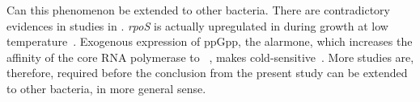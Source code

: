 Can this phenomenon be extended to other bacteria. There are
contradictory evidences in studies in . \emph{rpoS} is
actually upregulated in  during growth at low
temperature~\citep{Sledjeski1996}. Exogenous expression of ppGpp,
the alarmone, which increases the affinity of the core RNA
polymerase to \sigs{}~\citep{Jishage2002}, makes 
cold-sensitive~\citep{Jones1992}. More studies are, therefore,
required before the conclusion from the present study can be
extended to other bacteria, in more general sense.
